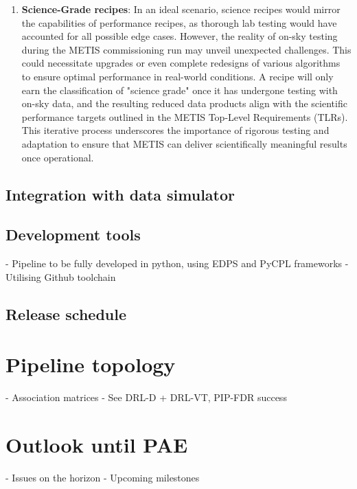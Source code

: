 \documentclass[a4paper]{spie}  %
\begin{document}
\begin{enumerate}
     \item \textbf{Science-Grade recipes}: In an ideal scenario, science recipes would mirror the capabilities of performance recipes, as thorough lab testing would have accounted for all possible edge cases. However, the reality of on-sky testing during the METIS commissioning run may unveil unexpected challenges. This could necessitate upgrades or even complete redesigns of various algorithms to ensure optimal performance in real-world conditions. A recipe will only earn the classification of "science grade" once it has undergone testing with on-sky data, and the resulting reduced data products align with the scientific performance targets outlined in the METIS Top-Level Requirements (TLRs). This iterative process underscores the importance of rigorous testing and adaptation to ensure that METIS can deliver scientifically meaningful results once operational. 
 \end{enumerate}



\subsection{Integration with data simulator}
\label{subsec:imp_sim}





\subsection{Development tools}
\label{subsec:imp_tools}
- Pipeline to be fully developed in python, using EDPS and PyCPL frameworks
- Utilising Github toolchain

\subsection{Release schedule}
\label{subsec:imp_schedule}


\section{Pipeline topology}
\label{sec:pip}
- Association matrices
- See DRL-D + DRL-VT, PIP-FDR success




\section{Outlook until PAE}
\label{sec:outlook}
- Issues on the horizon
- Upcoming milestones


\appendix    %

\acknowledgments %


\end{document}
